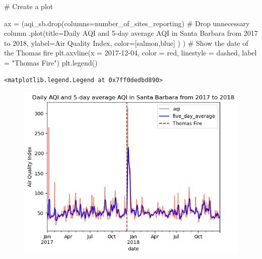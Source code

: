 \documentclass[
  letterpaper,
  DIV=11,
  numbers=noendperiod]{scrartcl}
\newenvironment{Shaded}{\begin{snugshade}}{\end{snugshade}}
\newcommand{\CommentTok}[1]{\textcolor[rgb]{0.37,0.37,0.37}{#1}}
\newcommand{\NormalTok}[1]{\textcolor[rgb]{0.00,0.23,0.31}{#1}}
\newcommand{\OperatorTok}[1]{\textcolor[rgb]{0.37,0.37,0.37}{#1}}
\newcommand{\StringTok}[1]{\textcolor[rgb]{0.13,0.47,0.30}{#1}}
\begin{document}
\begin{Shaded}
\begin{Highlighting}[]
\CommentTok{\# Create a plot}

\NormalTok{ax }\OperatorTok{=}\NormalTok{ (aqi\_sb.drop(columns}\OperatorTok{=}\StringTok{\textquotesingle{}number\_of\_sites\_reporting\textquotesingle{}}\NormalTok{) }\CommentTok{\# Drop unnecessary column}
\NormalTok{        .plot(title}\OperatorTok{=}\StringTok{\textquotesingle{}Daily AQI and 5{-}day average AQI in Santa Barbara from 2017 to 2018\textquotesingle{}}\NormalTok{,}
\NormalTok{              ylabel}\OperatorTok{=}\StringTok{\textquotesingle{}Air Quality Index\textquotesingle{}}\NormalTok{,}
\NormalTok{              color}\OperatorTok{=}\NormalTok{[}\StringTok{\textquotesingle{}salmon\textquotesingle{}}\NormalTok{,}\StringTok{\textquotesingle{}blue\textquotesingle{}}\NormalTok{] }
\NormalTok{)}
\NormalTok{)                                     }
\CommentTok{\# Show the date of the Thomas fire}
\NormalTok{plt.axvline(x }\OperatorTok{=} \StringTok{\textquotesingle{}2017{-}12{-}04\textquotesingle{}}\NormalTok{, }
\NormalTok{            color }\OperatorTok{=} \StringTok{\textquotesingle{}red\textquotesingle{}}\NormalTok{, }
\NormalTok{            linestyle }\OperatorTok{=} \StringTok{\textquotesingle{}dashed\textquotesingle{}}\NormalTok{, }
\NormalTok{            label }\OperatorTok{=} \StringTok{"Thomas Fire"}\NormalTok{)   }
\NormalTok{plt.legend()                  }
\end{Highlighting}
\end{Shaded}

\begin{verbatim}
<matplotlib.legend.Legend at 0x7ff0dedbd890>
\end{verbatim}

\begin{figure}[H]

{\centering \includegraphics{spatial_analysis_thomas_fire_files/figure-pdf/cell-12-output-2.png}

}

\end{figure}
\end{document}
